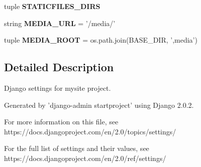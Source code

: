 \begin{DoxyCompactItemize}
\item 
tuple {\bfseries S\-T\-A\-T\-I\-C\-F\-I\-L\-E\-S\-\_\-\-D\-I\-R\-S}
\item 
\hypertarget{namespacemysite_1_1settings_a2e12145dd0b032b6b22563f5edf9f920}{string {\bfseries M\-E\-D\-I\-A\-\_\-\-U\-R\-L} = '/media/'}\label{namespacemysite_1_1settings_a2e12145dd0b032b6b22563f5edf9f920}

\item 
\hypertarget{namespacemysite_1_1settings_af0855b9d5c9c5a7023816863d5b1a4fb}{tuple {\bfseries M\-E\-D\-I\-A\-\_\-\-R\-O\-O\-T} = os.\-path.\-join(B\-A\-S\-E\-\_\-\-D\-I\-R, ',media')}\label{namespacemysite_1_1settings_af0855b9d5c9c5a7023816863d5b1a4fb}

\end{DoxyCompactItemize}


\subsection{Detailed Description}
\begin{DoxyVerb}Django settings for mysite project.

Generated by 'django-admin startproject' using Django 2.0.2.

For more information on this file, see
https://docs.djangoproject.com/en/2.0/topics/settings/

For the full list of settings and their values, see
https://docs.djangoproject.com/en/2.0/ref/settings/
\end{DoxyVerb}
 

